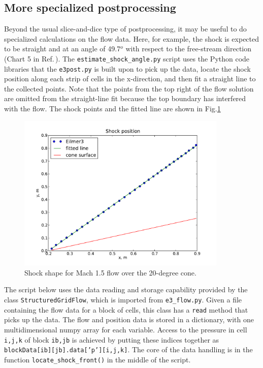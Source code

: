 \subsection{More specialized postprocessing}
\label{cone20-post-processing}
%
Beyond the usual slice-and-dice type of postprocessing, it may be useful to do
specialized calculations on the flow data.
Here, for example, the shock is expected to be straight and at an angle of 49.7$^o$ with
respect to the free-stream direction (Chart 5 in Ref.\,\cite{ames_53}).
The \texttt{estimate\_shock\_angle.py} script uses the Python code libraries 
that the \texttt{e3post.py} is built upon to pick up the data, 
locate the shock position along each strip of cells in the x-direction,
and then fit a straight line to the collected points.
Note that the points from the top right of the flow solution are omitted from the straight-line fit
because the top boundary has interfered with the flow.
The shock points and the fitted line are shown in Fig.\ref{cone20-shock-points-fig} 

\begin{figure}[htbp]
\begin{center}
\includegraphics[width=10cm]{../2D/cone20-simple/shock-shape.pdf}
\end{center}
\caption{Shock shape for Mach 1.5 flow over the 20-degree cone.}
\label{cone20-shock-points-fig}
\end{figure}

The script below uses the data reading and storage capability provided by 
the class \texttt{StructuredGridFlow}, which is imported from \texttt{e3\_flow.py}.
Given a file containing the flow data for a block of cells, this class has a \texttt{read} 
method that picks up the data.
The flow and position data is stored in a dictionary, with one multidimensional numpy array 
for each variable.
Access to the pressure in cell \texttt{i,j,k} of block \texttt{ib,jb} is achieved by
putting these indices together as \texttt{blockData[ib][jb].data['p'][i,j,k]}.
The core of the data handling is in the function \texttt{locate\_shock\_front()}
in the middle of the script.

